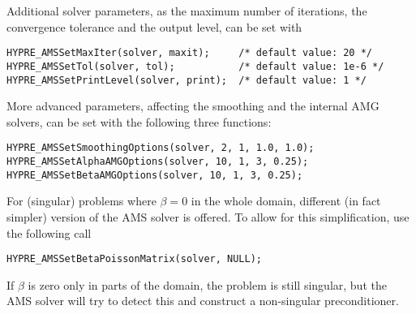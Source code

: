 Additional solver parameters, as the maximum number of iterations,
the convergence tolerance and the output level, can be set with
\begin{display}\begin{verbatim}
HYPRE_AMSSetMaxIter(solver, maxit);     /* default value: 20 */
HYPRE_AMSSetTol(solver, tol);           /* default value: 1e-6 */
HYPRE_AMSSetPrintLevel(solver, print);  /* default value: 1 */
\end{verbatim}\end{display}

More advanced parameters, affecting the smoothing and the
internal AMG solvers, can be set with the following three
functions:
\begin{display}\begin{verbatim}
HYPRE_AMSSetSmoothingOptions(solver, 2, 1, 1.0, 1.0);
HYPRE_AMSSetAlphaAMGOptions(solver, 10, 1, 3, 0.25);
HYPRE_AMSSetBetaAMGOptions(solver, 10, 1, 3, 0.25);
\end{verbatim}\end{display}

For (singular) problems where $\beta = 0$ in the whole domain,
different (in fact simpler) version of the AMS solver is offered.
To allow for this simplification, use the following \hypre{} call
\begin{display}\begin{verbatim}
HYPRE_AMSSetBetaPoissonMatrix(solver, NULL);
\end{verbatim}\end{display}
If $\beta$ is zero only in parts of the domain, the problem is still
singular, but the AMS solver will try to detect this and construct
a non-singular preconditioner.

